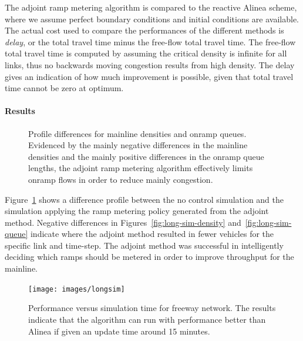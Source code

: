 							The adjoint ramp metering algorithm is compared to the reactive Alinea
							scheme, where we assume perfect boundary conditions and initial conditions
							are available. The actual cost used to compare the performances of
							the different methods is \emph{delay}, or the total travel time minus
							the free-flow total travel time. The free-flow total travel time is
							computed by assuming the critical density is infinite for all links,
							thus no backwards moving congestion results from high density. The
							delay gives an indication of how much improvement is possible, given
							that total travel time cannot be zero at optimum.
														
														
							\paragraph{Results}
														
							\begin{figure}[t]
								\hfill{}
																
								\caption{Profile differences for mainline densities and onramp queues. Evidenced
									by the mainly negative differences in the mainline densities and the
									mainly positive differences in the onramp queue lengths, the adjoint
									ramp metering algorithm effectively limits onramp flows in order to
									reduce mainly congestion.\label{fig:long-sim}}
							\end{figure}
														
														
							Figure~\ref{fig:long-sim} shows a difference profile between the
							no control simulation and the simulation applying the ramp metering
							policy generated from the adjoint method. Negative differences in
							Figures~\ref{fig:long-sim-density} and~\ref{fig:long-sim-queue}
							indicate where the adjoint method resulted in fewer vehicles for the
							specific link and time-step. The adjoint method was successful in
							intelligently deciding which ramps should be metered in order to improve
							throughput for the mainline.
							\begin{figure}
								\begin{centering}
									\texttt{[image: images/longsim]}
									\par\end{centering}
									\caption{Performance versus simulation time for freeway network. The results
										indicate that the algorithm can run with performance better than Alinea
										if given an update time around 15 minutes.}\label{fig:running-time}
								\end{figure}
																
